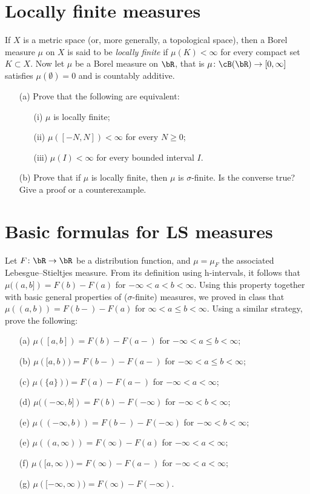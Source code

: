 \documentclass[lang=cn,11pt]{elegantbook}
\begin{document}
\section{Locally finite measures}
  If $X$ is a metric space (or, more generally, a topological space), then a Borel measure $\mu$ on $X$ is said to be \emph{locally finite} if $\mu(K)<\infty$ for every compact set $K\subset X$. Now let $\mu$ be a Borel measure on $\bR$, that is $\mu\colon\cB(\bR)\to[0,\infty]$ satisfies $\mu(\emptyset)=0$ and is countably additive.
  \begin{itemize}
  \item[(a)]
    Prove that the following are equivalent:
    \begin{itemize}
    \item[(i)]
      $\mu$ is locally finite;
    \item[(ii)]
      $\mu([-N,N])<\infty$ for every $N\ge0$;
    \item[(iii)]
      $\mu(I)<\infty$ for every bounded interval $I$.
    \end{itemize}
  \item[(b)]
    Prove that if $\mu$ is locally finite, then $\mu$ is $\sigma$-finite. Is the converse true? Give a proof or a counterexample.
  \end{itemize}
  
\section{Basic formulas for LS measures}
  Let $F\colon\bR\to\bR$ be a distribution function, and $\mu=\mu_F$ the associated Lebesgue--Stieltjes measure. From its definition using h-intervals, it follows that $\mu((a,b])=F(b)-F(a)$ for $-\infty<a<b<\infty$. Using this property together with basic general properties of ($\sigma$-finite) measures, we proved in class that $\mu((a,b))=F(b-)-F(a)$ for $\infty<a\le b<\infty$. Using a similar strategy, prove the following:
  \begin{itemize}
  \item[(a)]
    $\mu([a,b])=F(b)-F(a-)$ for $-\infty<a\le b<\infty$;
  \item[(b)]
    $\mu([a,b))=F(b-)-F(a-)$ for $-\infty<a\le b<\infty$;
  \item[(c)]
    $\mu(\{a\}))=F(a)-F(a-)$ for $-\infty<a<\infty$;
  \item[(d)]
    $\mu((-\infty,b])=F(b)-F(-\infty)$ for $-\infty<b<\infty$;
  \item[(e)]
    $\mu((-\infty,b))=F(b-)-F(-\infty)$ for $-\infty<b<\infty$;
  \item[(e)]
    $\mu((a,\infty))=F(\infty)-F(a)$ for $-\infty<a<\infty$;
  \item[(f)]
    $\mu([a,\infty))=F(\infty)-F(a-)$ for $-\infty<a<\infty$;
  \item[(g)]
    $\mu([-\infty,\infty))=F(\infty)-F(-\infty)$.
  \end{itemize}
\end{document}
